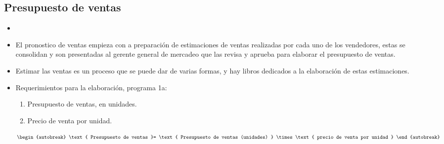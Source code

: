 \documentclass{article}
\begin{document}
\subsection{Presupuesto de ventas}
\begin{itemize}
    \item {} 
    \item El pronostico de ventas empieza con a preparación de estimaciones de ventas realizadas por cada uno de los vendedores, estas se consolidan y son presentadas al gerente general de mercadeo que las revisa y aprueba para elaborar el presupuesto de ventas.
    \item Estimar las ventas es un proceso que se puede dar de varias formas, y hay libros dedicados a la elaboración de estas estimaciones.
    \item Requerimientos para la elaboración, programa 1a:
        \begin{enumerate}
            \item Presupuesto de ventas, en unidades.
            \item Precio de venta por unidad.
        \end{enumerate}
        
        \begin{align*}\begin{autobreak}
          \text{ Presupuesto de ventas }= \text{ Presupuesto de ventas (unidades) } \times \text{ precio de venta por unidad }
        \end{autobreak}\end{align*}
        
\end{itemize}

\end{document}
